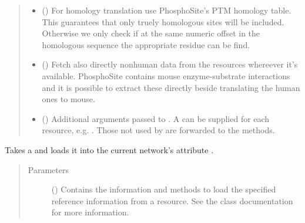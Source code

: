 \documentclass[letterpaper,10pt,english]{sphinxmanual}
\begin{document}
\begin{fulllineitems}
\begin{fulllineitems}
\begin{quote}
\begin{description}
\begin{itemize}
\item {} 
 () \textendash{} For homology translation use
PhosphoSite’s PTM homology table. This guarantees that only
truely homologous sites will be included. Otherwise we only
check if at the same numeric offset in the homologous sequence
the appropriate residue can be find.

\item {} 
 () \textendash{} Fetch also directly nonhuman
data from the resources whereever it’s available. PhosphoSite
contains mouse enzyme-substrate interactions and it is possible
to extract these directly beside translating the human ones
to mouse.

\item {} 
 () \textendash{} Additional arguments passed to .
A  can be supplied for each resource, e.g.
.
Those not used by  are forwarded to the
 methods.

\end{itemize}

\end{description}\end{quote}

\end{fulllineitems}


\begin{fulllineitems}
\label{\detokenize{main:pypath.main.PyPath.load_reflist}}
Takes a  and loads it
into the current network’s attribute
.
\begin{quote}\begin{description}
\item[{Parameters}] \leavevmode
{} () \textendash{} Contains the information and methods to load the specified
reference information from a resource. See the class
documentation for more information.


\end{description}
\end{quote}
\end{fulllineitems}
\end{fulllineitems}
\end{document}
